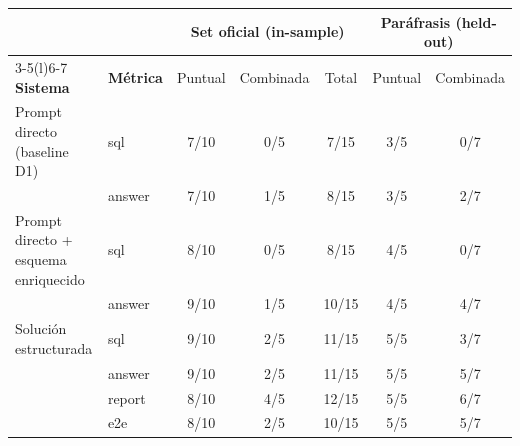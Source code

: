 \begin{tabular}{@{}llccccc@{}}
\toprule
& & \multicolumn{3}{c}{\textbf{Set oficial (in-sample)}} & \multicolumn{2}{c}{\textbf{Paráfrasis (held-out)}} \\
\cmidrule(lr){3-5}\cmidrule(l){6-7}
\textbf{Sistema} & \textbf{Métrica} & Puntual & Combinada & Total & Puntual & Combinada \\
\midrule
Prompt directo (baseline D1) & sql & 7/10 & 0/5 & 7/15 & 3/5 & 0/7 \\
 & answer & 7/10 & 1/5 & 8/15 & 3/5 & 2/7 \\
\addlinespace
Prompt directo + esquema enriquecido & sql & 8/10 & 0/5 & 8/15 & 4/5 & 0/7 \\
 & answer & 9/10 & 1/5 & 10/15 & 4/5 & 4/7 \\
\addlinespace
Solución estructurada & sql & 9/10 & 2/5 & 11/15 & 5/5 & 3/7 \\
 & answer & 9/10 & 2/5 & 11/15 & 5/5 & 5/7 \\
 & report & 8/10 & 4/5 & 12/15 & 5/5 & 6/7 \\
 & e2e & 8/10 & 2/5 & 10/15 & 5/5 & 5/7 \\
\bottomrule
\end{tabular}
